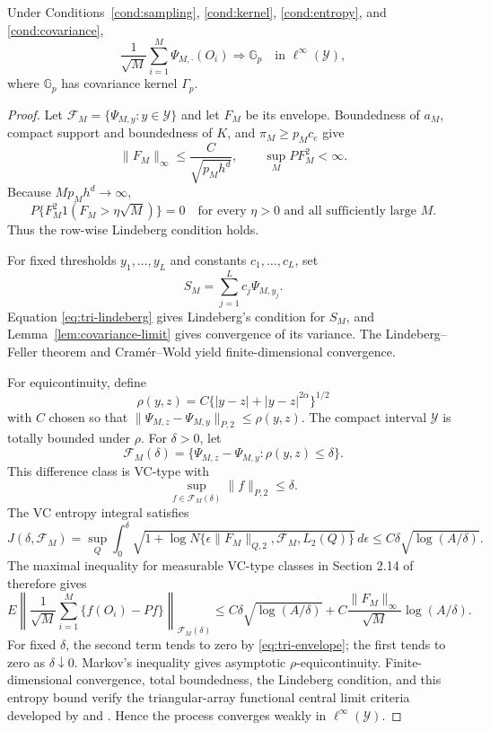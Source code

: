 \begin{lemma}
\label{lem:triangular-clt}
Under Conditions~\ref{cond:sampling}, \ref{cond:kernel},
\ref{cond:entropy}, and \ref{cond:covariance},
\[
\frac1{\sqrt M}
\sum_{i=1}^M\Psi_{M,\cdot}(O_i)
\Rightarrow
\mathbb G_p
\quad\text{in }\ell^\infty(\mathcal Y),
\]
where \(\mathbb G_p\) has covariance kernel \(\Gamma_p\).
\end{lemma}

\begin{proof}
Let \(\mathcal F_M=\{\Psi_{M,y}:y\in\mathcal Y\}\) and let \(F_M\) be its envelope. Boundedness of \(a_M\), compact support and boundedness of \(K\), and \(\pi_M\ge p_Mc_e\) give
\begin{equation}
\|F_M\|_\infty
\le
\frac{C}{\sqrt{p_Mh^d}},
\qquad
\sup_M P F_M^2<\infty.
\label{eq:tri-envelope}
\end{equation}
Because \(Mp_Mh^d\to\infty\),
\begin{equation}
P\{F_M^2 1(F_M>\eta\sqrt M)\}=0
\quad\text{for every \(\eta>0\) and all sufficiently large \(M\)}.
\label{eq:tri-lindeberg}
\end{equation}
Thus the row-wise Lindeberg condition holds.

For fixed thresholds \(y_1,\ldots,y_L\) and constants \(c_1,\ldots,c_L\), set
\[
S_M=
\sum_{j=1}^Lc_j\Psi_{M,y_j}.
\]
Equation \eqref{eq:tri-lindeberg} gives Lindeberg's condition for \(S_M\), and Lemma~\ref{lem:covariance-limit} gives convergence of its variance. The Lindeberg--Feller theorem and Cram\'er--Wold yield finite-dimensional convergence.

For equicontinuity, define
\[
\rho(y,z)
=
C\{|y-z|+|y-z|^{2\alpha}\}^{1/2}
\]
with \(C\) chosen so that \(\|\Psi_{M,z}-\Psi_{M,y}\|_{P,2}\le\rho(y,z)\). The compact interval \(\mathcal Y\) is totally bounded under \(\rho\). For \(\delta>0\), let
\[
\mathcal F_M(\delta)
=
\{\Psi_{M,z}-\Psi_{M,y}:\rho(y,z)\le\delta\}.
\]
This difference class is VC-type with
\[
\sup_{f\in\mathcal F_M(\delta)}\|f\|_{P,2}\le\delta.
\]
The VC entropy integral satisfies
\[
J(\delta,\mathcal F_M)
=
\sup_Q
\int_0^\delta
\sqrt{1+\log N\{\epsilon\|F_M\|_{Q,2},\mathcal F_M,L_2(Q)\}}
\,d\epsilon
\le C\delta\sqrt{\log(A/\delta)}.
\]
The maximal inequality for measurable VC-type classes in Section 2.14 of \citet{VanderVaartWellner1996} therefore gives
\begin{equation}
E\left\|
\frac1{\sqrt M}\sum_{i=1}^M\{f(O_i)-Pf\}
\right\|_{\mathcal F_M(\delta)}
\le
C\delta\sqrt{\log(A/\delta)}
+
C\frac{\|F_M\|_\infty}{\sqrt M}\log(A/\delta).
\label{eq:tri-maximal-bound}
\end{equation}
For fixed \(\delta\), the second term tends to zero by \eqref{eq:tri-envelope}; the first tends to zero as \(\delta\downarrow0\). Markov's inequality gives asymptotic \(\rho\)-equicontinuity. Finite-dimensional convergence, total boundedness, the Lindeberg condition, and this entropy bound verify the triangular-array functional central limit criteria developed by \citet{Ziegler1997} and \citet{Arcones1999}. Hence the process converges weakly in \(\ell^\infty(\mathcal Y)\).
\end{proof}

